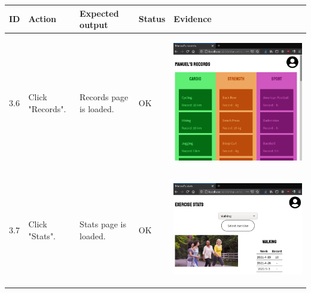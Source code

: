 \documentclass[12pt,twoside,titlepage,a4paper]{article}
\theoremstyle{definicion}
\theoremstyle{lema}
\theoremstyle{teorema}
\theoremstyle{corolario}
\theoremstyle{ejemplo}
\theoremstyle{nota}
\begin{document}
\begin{table}[!h]
	\centering
	\begin{tabular}{|m{0.6cm}|m{2.9cm}|m{3.6cm}|m{1.1cm}|m{5.9cm}|}
		\hline
		\textbf{ID} & \textbf{Action} & \textbf{Expected output} & \textbf{Status} & \textbf{Evidence} \\ 
		\hline
		3.6 & Click "Records". & Records page is loaded. & OK &
		\begin{center}\includegraphics[scale=0.24]{records.png}\end{center} \\
		\hline
		3.7 & Click "Stats". & Stats page is loaded. & OK &
		\begin{center}\includegraphics[scale=0.24]{userpage3-stats1.png}\end{center} \\

\end{tabular}
\end{table}
\end{document}
